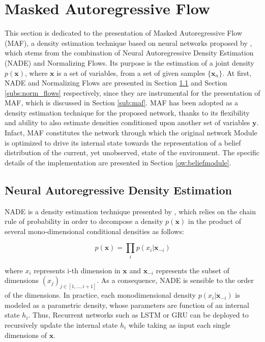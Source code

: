     \section{Masked Autoregressive Flow}
        \label{prel:maf}
        This section is dedicated to the presentation of Masked Autoregressive Flow (MAF), a density estimation technique based on neural networks proposed by , which stems from the combination of Neural Autoregressive Density Estimation (NADE) and Normalizing Flows. Its purpose is the estimation of a joint density $p(\mathbf{x})$, where $\mathbf{x}$ is a set of variables, from a set of given samples $\{ \mathbf{x}_n \}$. At first, NADE and Normalizing Flows are presented in Section \ref{subs:nade} and Section \ref{subs:norm_flows} respectively, since they are instrumental for the presentation of MAF, which is discussed in Section \ref{sub:maf}. \newline
        MAF has been adopted as a density estimation technique for the proposed network, thanks to its flexibility and ability to also estimate densities conditioned upon another set of variables $\mathbf{y}$. Infact, MAF constitutes the network through which the original network Module is optimized to drive its internal state towards the representation of a belief distribution of the current, yet unobserved, state of the environment. The specific details of the implementation are presented in Section \ref{ow:beliefmodule}.
        
        \subsection{Neural Autoregressive Density Estimation}
        \label{subs:nade}
            NADE is a density estimation technique presented by , which relies on the chain rule of probability in order to decompose a density $p(\mathbf{x})$ in the product of several mono-dimensional conditional densities as follows:
            
            \[ p(\mathbf{x}) = \prod_{i} p(x_i | \mathbf{x}_{-i} ) \]
            
            where $x_i$ represents i-th dimension in $\mathbf{x}$ and $\mathbf{x}_{-i}$ represents the subset of dimensions  $(x_j)_{j\in[1,\dots,i+1]}$. As a consequence, NADE is sensible to the order of the dimensions. In practice, each monodimensional density $p(x_i | \mathbf{x}_{-i} )$ is modeled as a parametric density, whose parameters are function of an internal state $h_i$. Thus, Recurrent networks such as LSTM or GRU can be deployed to recursively update the internal state $h_i$ while taking as input each single dimensions of $\mathbf{x}$.
            
